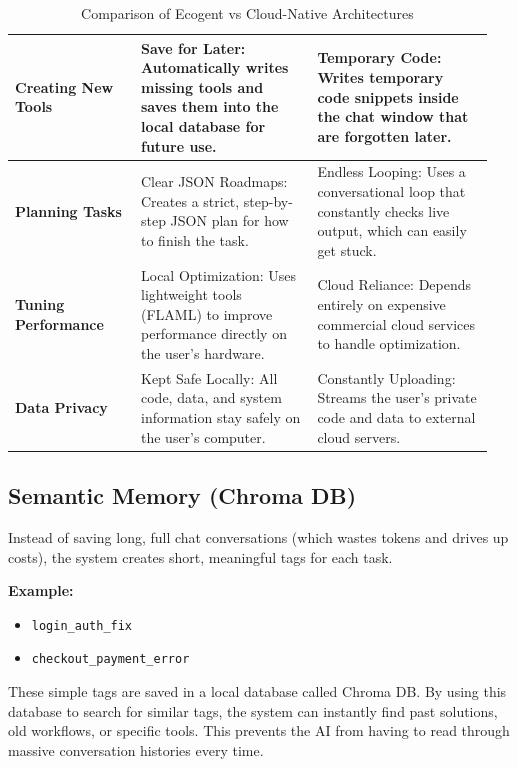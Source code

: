 \begin{table}[H]
{\begin{tabular}{|p{0.25\linewidth}|p{0.35\linewidth}|p{0.35\linewidth}|}
\textbf{Creating New Tools} & Save for Later: Automatically writes missing tools and saves them into the local database for future use. & Temporary Code: Writes temporary code snippets inside the chat window that are forgotten later. \\ \hline
\textbf{Planning Tasks} & Clear JSON Roadmaps: Creates a strict, step-by-step JSON plan for how to finish the task. & Endless Looping: Uses a conversational loop that constantly checks live output, which can easily get stuck. \\ \hline
\textbf{Tuning Performance} & Local Optimization: Uses lightweight tools (FLAML) to improve performance directly on the user's hardware. & Cloud Reliance: Depends entirely on expensive commercial cloud services to handle optimization. \\ \hline
\textbf{Data Privacy} & Kept Safe Locally: All code, data, and system information stay safely on the user's computer. & Constantly Uploading: Streams the user's private code and data to external cloud servers. \\ \hline
\end{tabular}%
}
\caption{Comparison of Ecogent vs Cloud-Native Architectures}
\label{tab:architecture_comparison}
\end{table}



\subsection{Semantic Memory (Chroma DB)}
Instead of saving long, full chat conversations (which wastes tokens and drives up costs), the system creates short, meaningful tags for each task. 

\textbf{Example:}
\begin{itemize}
    \item \texttt{login\_auth\_fix}
    \item \texttt{checkout\_payment\_error}
\end{itemize}
These simple tags are saved in a local database called Chroma DB. By using this database to search for similar tags, the system can instantly find past solutions, old workflows, or specific tools. This prevents the AI from having to read through massive conversation histories every time.\\

